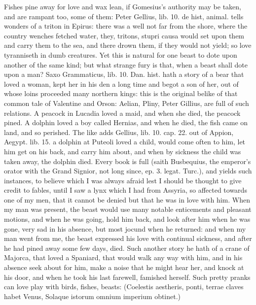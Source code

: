 {Fishes pine away for love and wax lean, if Gomesius's authority
may be taken, and are rampant too, some of them: Peter Gellius, lib.
10. de hist, animal. tells wonders of a triton in Epirus: there was a
well not far from the shore, where the country wenches fetched water,
they, tritons, stupri causa would set upon them and carry them to
the sea, and there drown them, if they would not yield; so love
tyranniseth in dumb creatures. Yet this is natural for one beast to
dote upon another of the same kind; but what strange fury is that, when
a beast shall dote upon a man? Saxo Grammaticus, lib. 10. Dan. hist.
hath a story of a bear that loved a woman, kept her in his den a long
time and begot a son of her, out of whose loins proceeded many northern
kings: this is the original belike of that common tale of Valentine and
Orson: Aelian, Pliny, Peter Gillius, are full of such relations. A
peacock in Lucadia loved a maid, and when she died, the peacock pined.
A dolphin loved a boy called Hernias, and when he died, the fish
came on land, and so perished. The like adds Gellius, lib. 10. cap. 22.
out of Appion, Aegypt. lib. 15. a dolphin at Puteoli loved a child,
would come often to him, let him get on his back, and carry him about,
and when by sickness the child was taken away, the dolphin died.
Every book is full (saith Busbequius, the emperor's orator with
the Grand Signior, not long since, ep. 3. legat. Turc.), and yields
such instances, to believe which I was always afraid lest I should be
thought to give credit to fables, until I saw a lynx which I had from
Assyria, so affected towards one of my men, that it cannot be denied
but that he was in love with him. When my man was present, the beast
would use many notable enticements and pleasant motions, and when he
was going, hold him back, and look after him when he was gone, very sad
in his absence, but most jocund when he returned: and when my man went
from me, the beast expressed his love with continual sickness, and
after he had pined away some few days, died. Such another story he hath
of a crane of Majorca, that loved a Spaniard, that would walk any way
with him, and in his absence seek about for him, make a noise that he
might hear her, and knock at his door, and when he took his last
farewell, famished herself. Such pretty pranks can love play with
birds, fishes, beasts:
(Coelestis aestheris, ponti, terrae claves habet Venus,
Solaque istorum omnium imperium obtinet.)

}
